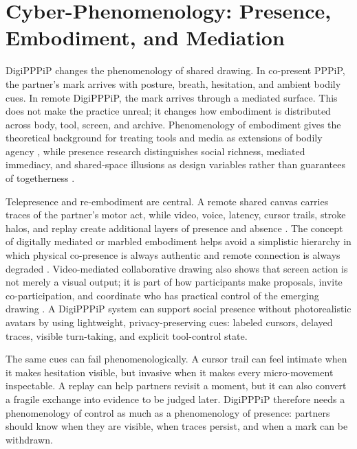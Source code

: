 \documentclass[
  english,
]{article}
\begin{document}
\newpage

\section{Cyber-Phenomenology: Presence, Embodiment, and
Mediation}\label{sec:phenomenology}

DigiPPPiP changes the phenomenology of shared drawing. In co-present
PPPiP, the partner's mark arrives with posture, breath, hesitation, and
ambient bodily cues. In remote DigiPPPiP, the mark arrives through a
mediated surface. This does not make the practice unreal; it changes how
embodiment is distributed across body, tool, screen, and archive.
Phenomenology of embodiment gives the theoretical background for
treating tools and media as extensions of bodily agency
\citep{merleauponty2012phenomenology}, while presence research
distinguishes social richness, mediated immediacy, and shared-space
illusions as design variables rather than guarantees of togetherness
\citep{lombard1997presence, biocca1997cyborg, lee2004presence}.

Telepresence and re-embodiment are central. A remote shared canvas
carries traces of the partner's motor act, while video, voice, latency,
cursor trails, stroke halos, and replay create additional layers of
presence and absence
\citep{lombard1997presence, biocca1997cyborg, lee2004presence}. The
concept of digitally mediated or marbled embodiment helps avoid a
simplistic hierarchy in which physical co-presence is always authentic
and remote connection is always degraded \citep{atuk2024bodiesonline}.
Video-mediated collaborative drawing also shows that screen action is
not merely a visual output; it is part of how participants make
proposals, invite co-participation, and coordinate who has practical
control of the emerging drawing \citep{oittinen2025videodrawing}. A
DigiPPPiP system can support social presence without photorealistic
avatars by using lightweight, privacy-preserving cues: labeled cursors,
delayed traces, visible turn-taking, and explicit tool-control state.

The same cues can fail phenomenologically. A cursor trail can feel
intimate when it makes hesitation visible, but invasive when it makes
every micro-movement inspectable. A replay can help partners revisit a
moment, but it can also convert a fragile exchange into evidence to be
judged later. DigiPPPiP therefore needs a phenomenology of control as
much as a phenomenology of presence: partners should know when they are
visible, when traces persist, and when a mark can be withdrawn.
\end{document}
